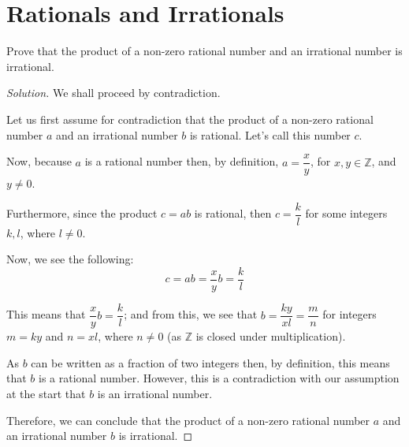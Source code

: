 \documentclass{article}
\newenvironment{solution}{\begin{proof}[Solution]}{\end{proof}}
\newcommand{\ZZ}{\mathbb{Z}}
\begin{document}
\section{Rationals and Irrationals}
\begin{hw}
	Prove that the product of a non-zero rational number and an irrational number is irrational.
\end{hw}
\begin{solution}
	We shall proceed by contradiction.
	
	Let us first assume for contradiction that the product of a non-zero rational number $a$ and an irrational number $b$ is rational. Let's call this number $c$. 
	
	Now, because $a$ is a rational number then, by definition, $a = \dfrac{x}{y}$, for $x,y \in \ZZ$, and $y \not= 0$.
	
	Furthermore, since the product $c=ab$ is rational, then $c = \dfrac{k}{l}$ for some integers $k, l$, where $l \not= 0$.
	
	Now, we see the following: 
	\begin{equation*}
		c = ab = \dfrac{x}{y}b = \dfrac{k}{l}
	\end{equation*}

	This means that $\dfrac{x}{y}b = \dfrac{k}{l}$; and from this, we see that $b = \dfrac{ky}{xl} = \dfrac{m}{n}$ for integers $m=ky$ and $n=xl$, where $n \not= 0$ (as $\ZZ$ is closed under multiplication).
	
	As $b$ can be written as a fraction of two integers then, by definition, this means that $b$ is a rational number. However, this is a contradiction with our assumption at the start that $b$ is an irrational number.
	
	Therefore, we can conclude that the product of a non-zero rational number $a$ and an irrational number $b$ is irrational.
\end{solution}

\newpage
\end{document}
